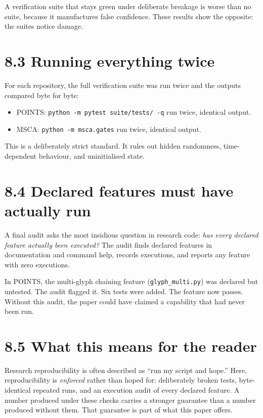 A verification suite that stays green under deliberate breakage is worse than no suite, because it manufactures false confidence. These results show the opposite: the suites notice damage.

\section*{8.3 Running everything twice}

For each repository, the full verification suite was run twice and the outputs compared byte for byte:

\begin{itemize}
\item POINTS: \texttt{python -m pytest suite/tests/ -q} run twice, identical output.
\item MSCA: \texttt{python -m msca.gates} run twice, identical output.
\end{itemize}

This is a deliberately strict standard. It rules out hidden randomness, time-dependent behaviour, and uninitialised state.

\section*{8.4 Declared features must have actually run}

A final audit asks the most insidious question in research code: \textit{has every declared feature actually been executed?} The audit finds declared features in documentation and command help, records executions, and reports any feature with zero executions.

In POINTS, the multi-glyph chaining feature (\texttt{glyph\_multi.py}) was declared but untested. The audit flagged it. Six tests were added. The feature now passes. Without this audit, the paper could have claimed a capability that had never been run.

\section*{8.5 What this means for the reader}

Research reproducibility is often described as ``run my script and hope.'' Here, reproducibility is \textit{enforced} rather than hoped for: deliberately broken tests, byte-identical repeated runs, and an execution audit of every declared feature. A number produced under these checks carries a stronger guarantee than a number produced without them. That guarantee is part of what this paper offers.
